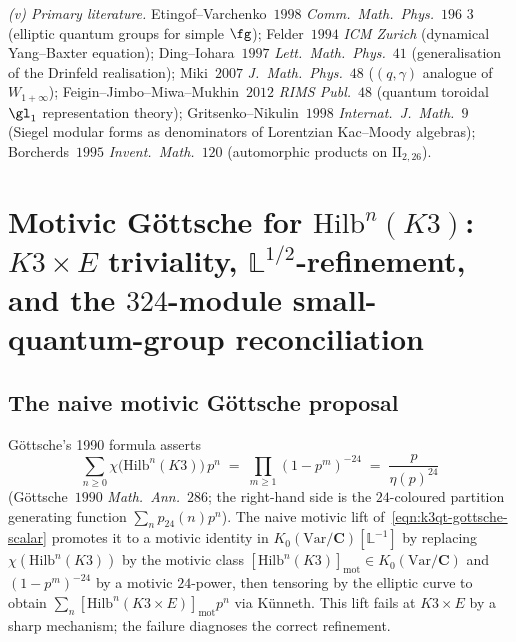 \begin{remark}
\emph{(v) Primary literature.} Etingof--Varchenko~$1998$
\emph{Comm.\ Math.\ Phys.}~$196$ \textnumero $3$ (elliptic quantum
groups for simple $\fg$); Felder~$1994$ \emph{ICM Zurich} (dynamical
Yang--Baxter equation); Ding--Iohara~$1997$
\emph{Lett.\ Math.\ Phys.}~$41$ (generalisation of the Drinfeld
realisation); Miki~$2007$ \emph{J.\ Math.\ Phys.}~$48$
($(q, \gamma)$ analogue of $W_{1 + \infty}$);
Feigin--Jimbo--Miwa--Mukhin~$2012$ \emph{RIMS Publ.}~$48$
(quantum toroidal $\gl_1$ representation theory);
Gritsenko--Nikulin~$1998$ \emph{Internat.\ J.\ Math.}~$9$
(Siegel modular forms as denominators of Lorentzian Kac--Moody
algebras); Borcherds~$1995$ \emph{Invent.\ Math.}~$120$
(automorphic products on $\mathrm{II}_{2, 26}$).
\end{remark}


\section{Motivic Göttsche for \texorpdfstring{$\mathrm{Hilb}^n(K3)$}{Hilb-n(K3)}: \texorpdfstring{$K3 \times E$}{K3 x E}
triviality, \texorpdfstring{$\mathbb L^{1/2}$}{L-1/2}-refinement, and the \texorpdfstring{$324$}{324}-module
small-quantum-group reconciliation}
\label{sec:k3qt-motivic-gottsche-hilb-k3e}

\subsection*{The naive motivic Göttsche proposal}

Göttsche's 1990 formula asserts
\begin{equation}
\label{eqn:k3qt-gottsche-scalar}
 \sum_{n \geq 0} \chi\!\bigl(\mathrm{Hilb}^n(K3)\bigr)\, p^n
 \;=\;
 \prod_{m \geq 1} (1 - p^m)^{-24}
 \;=\;
 \frac{p}{\eta(p)^{24}}
\end{equation}
(Göttsche~$1990$ \emph{Math.~Ann.}~$286$; the right-hand side is
the $24$-coloured partition generating function $\sum_n p_{24}(n) p^n$).
The naive motivic lift of~\eqref{eqn:k3qt-gottsche-scalar}
promotes it to a motivic identity in $K_0(\mathrm{Var}/\mathbf C)[\mathbb L^{-1}]$
by replacing $\chi(\mathrm{Hilb}^n(K3))$ by the motivic class
$[\mathrm{Hilb}^n(K3)]_{\mathrm{mot}} \in K_0(\mathrm{Var}/\mathbf C)$
and $(1 - p^m)^{-24}$ by a motivic $24$-power, then tensoring by
the elliptic curve to obtain $\sum_n [\mathrm{Hilb}^n(K3 \times E)]_{\mathrm{mot}} p^n$
via Künneth. This lift fails at $K3 \times E$ by a sharp
mechanism; the failure diagnoses the correct refinement.

